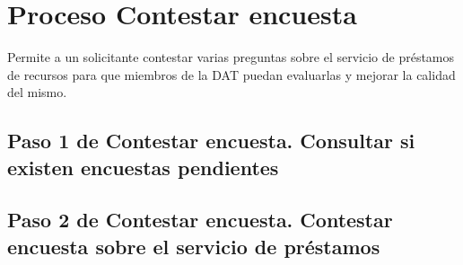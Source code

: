 \chapter{Proceso Contestar encuesta}
	Permite a un solicitante contestar varias preguntas sobre el servicio de
  préstamos de recursos para que miembros de la DAT puedan evaluarlas y
  mejorar la calidad del mismo.


\section{Paso 1 de Contestar encuesta.
	Consultar si existen encuestas pendientes}
	

\section{Paso 2 de Contestar encuesta.
	Contestar encuesta sobre el servicio de préstamos}
	
